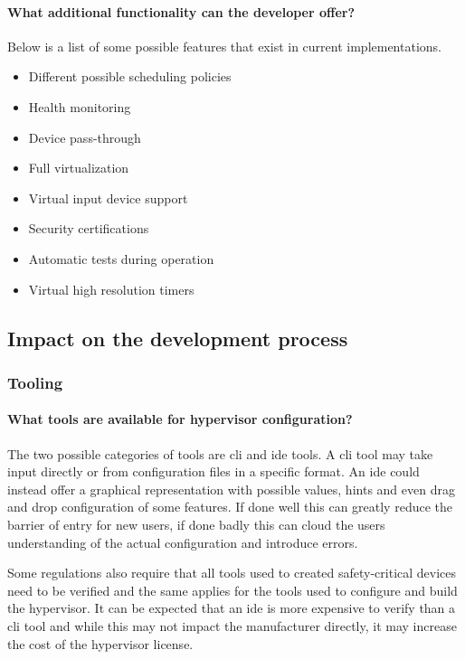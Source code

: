 \paragraph{What additional functionality can the developer offer?}
Below is a list of some possible features that exist in current implementations.
\begin{itemize}
    \item Different possible scheduling policies
    \item Health monitoring
    \item Device pass-through
    \item Full virtualization
    \item Virtual input device support
    \item Security certifications
    \item Automatic tests during operation
    \item Virtual high resolution timers
\end{itemize}

\subsection{Impact on the development process}
\subsubsection{Tooling}
\paragraph{What tools are available for hypervisor configuration?}
The two possible categories of tools are \acrshort{cli} and \acrshort{ide} tools. A \acrshort{cli} tool may take input directly or from configuration files in a specific format. An \acrshort{ide} could instead offer a graphical representation with possible values, hints and even drag and drop configuration of some features. If done well this can greatly reduce the barrier of entry for new users, if done badly this can cloud the users understanding of the actual configuration and introduce errors.

Some regulations also require that all tools used to created safety-critical devices need to be verified and the same applies for the tools used to configure and build the hypervisor. It can be expected that an \acrshort{ide} is more expensive to verify than a \acrshort{cli} tool and while this may not impact the manufacturer directly, it may increase the cost of the hypervisor license.
